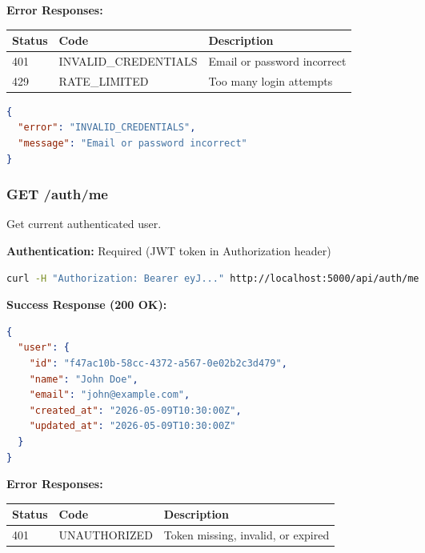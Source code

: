 \documentclass[12pt,a4paper,oneside]{article}
\begin{document}
\textbf{Error Responses:}

\begin{table}[H]
\centering
\begin{tabular}{|p{1.8cm}|p{2.8cm}|p{8.4cm}|}
\hline
\textbf{Status} & \textbf{Code} & \textbf{Description} \\
\hline
401 & INVALID\_CREDENTIALS & Email or password incorrect \\
\hline
429 & RATE\_LIMITED & Too many login attempts \\
\hline
\end{tabular}
\end{table}

\begin{lstlisting}[language=JSON, caption=Error Response 401]
{
  "error": "INVALID_CREDENTIALS",
  "message": "Email or password incorrect"
}
\end{lstlisting}

\subsubsection{GET /auth/me}

Get current authenticated user.

\textbf{Authentication:} Required (JWT token in Authorization header)

\begin{lstlisting}[language=bash, caption=Request with Auth]
curl -H "Authorization: Bearer eyJ..." http://localhost:5000/api/auth/me
\end{lstlisting}

\textbf{Success Response (200 OK):}

\begin{lstlisting}[language=JSON, caption=Response 200]
{
  "user": {
    "id": "f47ac10b-58cc-4372-a567-0e02b2c3d479",
    "name": "John Doe",
    "email": "john@example.com",
    "created_at": "2026-05-09T10:30:00Z",
    "updated_at": "2026-05-09T10:30:00Z"
  }
}
\end{lstlisting}

\textbf{Error Responses:}

\begin{table}[H]
\centering
\begin{tabular}{|p{1.8cm}|p{2.5cm}|p{8.7cm}|}
\hline
\textbf{Status} & \textbf{Code} & \textbf{Description} \\
\hline
401 & UNAUTHORIZED & Token missing, invalid, or expired \\
\hline
\end{tabular}
\end{table}
\end{document}
